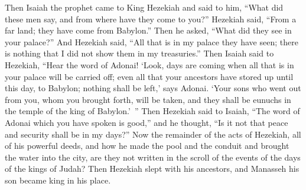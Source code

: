 \begin{biblechapter}
\verse Then Isaiah the prophet came to King Hezekiah and said to him, “What did these men say, and from where have they come to you?” Hezekiah said, “From a far land; they have come from Babylon.”
\verse Then he asked, “What did they see in your palace?” And Hezekiah said, “All that is in my palace they have seen; there is nothing that I did not show them in my treasuries.”
\verse Then Isaiah said to Hezekiah, “Hear the word of Adonai!
\verse ‘Look, days are coming when all that is in your palace will be carried off; even all that your ancestors have stored up until this day, to Babylon; nothing shall be left,’ says Adonai.
\verse ‘Your sons who went out from you, whom you brought forth, will be taken, and they shall be eunuchs in the temple of the king of Babylon.’ ”
\verse Then Hezekiah said to Isaiah, “The word of Adonai which you have spoken is good,” and he thought, “Is it not that peace and security shall be in my days?”
\verse Now the remainder of the acts of Hezekiah, all of his powerful deeds, and how he made the pool and the conduit and brought the water into the city, are they not written in the scroll of the events of the days of the kings of Judah?
\verse Then Hezekiah slept with his ancestors, and Manasseh his son became king in his place.
\end{biblechapter}

